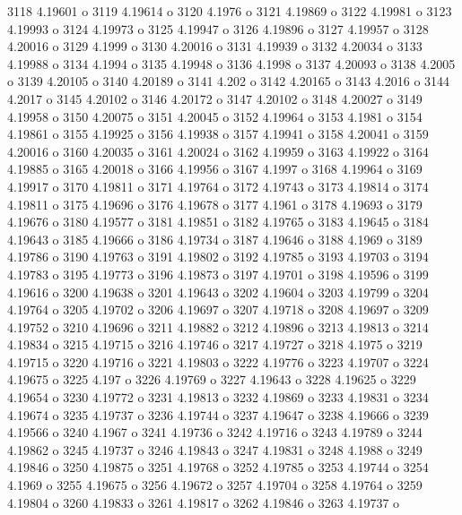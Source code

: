  3118  4.19601  o
 3119  4.19614  o
 3120  4.1976  o
 3121  4.19869  o
 3122  4.19981  o
 3123  4.19993  o
 3124  4.19973  o
 3125  4.19947  o
 3126  4.19896  o
 3127  4.19957  o
 3128  4.20016  o
 3129  4.1999  o
 3130  4.20016  o
 3131  4.19939  o
 3132  4.20034  o
 3133  4.19988  o
 3134  4.1994  o
 3135  4.19948  o
 3136  4.1998  o
 3137  4.20093  o
 3138  4.2005  o
 3139  4.20105  o
 3140  4.20189  o
 3141  4.202  o
 3142  4.20165  o
 3143  4.2016  o
 3144  4.2017  o
 3145  4.20102  o
 3146  4.20172  o
 3147  4.20102  o
 3148  4.20027  o
 3149  4.19958  o
 3150  4.20075  o
 3151  4.20045  o
 3152  4.19964  o
 3153  4.1981  o
 3154  4.19861  o
 3155  4.19925  o
 3156  4.19938  o
 3157  4.19941  o
 3158  4.20041  o
 3159  4.20016  o
 3160  4.20035  o
 3161  4.20024  o
 3162  4.19959  o
 3163  4.19922  o
 3164  4.19885  o
 3165  4.20018  o
 3166  4.19956  o
 3167  4.1997  o
 3168  4.19964  o
 3169  4.19917  o
 3170  4.19811  o
 3171  4.19764  o
 3172  4.19743  o
 3173  4.19814  o
 3174  4.19811  o
 3175  4.19696  o
 3176  4.19678  o
 3177  4.1961  o
 3178  4.19693  o
 3179  4.19676  o
 3180  4.19577  o
 3181  4.19851  o
 3182  4.19765  o
 3183  4.19645  o
 3184  4.19643  o
 3185  4.19666  o
 3186  4.19734  o
 3187  4.19646  o
 3188  4.1969  o
 3189  4.19786  o
 3190  4.19763  o
 3191  4.19802  o
 3192  4.19785  o
 3193  4.19703  o
 3194  4.19783  o
 3195  4.19773  o
 3196  4.19873  o
 3197  4.19701  o
 3198  4.19596  o
 3199  4.19616  o
 3200  4.19638  o
 3201  4.19643  o
 3202  4.19604  o
 3203  4.19799  o
 3204  4.19764  o
 3205  4.19702  o
 3206  4.19697  o
 3207  4.19718  o
 3208  4.19697  o
 3209  4.19752  o
 3210  4.19696  o
 3211  4.19882  o
 3212  4.19896  o
 3213  4.19813  o
 3214  4.19834  o
 3215  4.19715  o
 3216  4.19746  o
 3217  4.19727  o
 3218  4.1975  o
 3219  4.19715  o
 3220  4.19716  o
 3221  4.19803  o
 3222  4.19776  o
 3223  4.19707  o
 3224  4.19675  o
 3225  4.197  o
 3226  4.19769  o
 3227  4.19643  o
 3228  4.19625  o
 3229  4.19654  o
 3230  4.19772  o
 3231  4.19813  o
 3232  4.19869  o
 3233  4.19831  o
 3234  4.19674  o
 3235  4.19737  o
 3236  4.19744  o
 3237  4.19647  o
 3238  4.19666  o
 3239  4.19566  o
 3240  4.1967  o
 3241  4.19736  o
 3242  4.19716  o
 3243  4.19789  o
 3244  4.19862  o
 3245  4.19737  o
 3246  4.19843  o
 3247  4.19831  o
 3248  4.1988  o
 3249  4.19846  o
 3250  4.19875  o
 3251  4.19768  o
 3252  4.19785  o
 3253  4.19744  o
 3254  4.1969  o
 3255  4.19675  o
 3256  4.19672  o
 3257  4.19704  o
 3258  4.19764  o
 3259  4.19804  o
 3260  4.19833  o
 3261  4.19817  o
 3262  4.19846  o
 3263  4.19737  o
